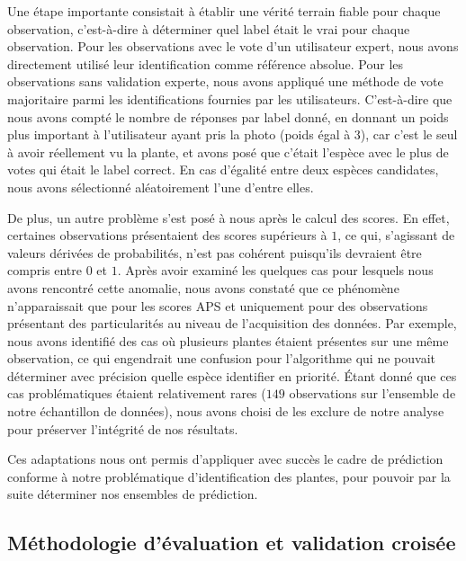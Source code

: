 \documentclass[a4paper,12pt]{article}
\begin{document}
Une étape importante consistait à établir une vérité terrain fiable pour chaque observation, c'est-à-dire à déterminer quel label était le vrai pour chaque observation. Pour les observations avec le vote d'un utilisateur expert, nous avons directement utilisé leur identification comme référence absolue. Pour les observations sans validation experte, nous avons appliqué une méthode de vote majoritaire parmi les identifications fournies par les utilisateurs. C'est-à-dire que nous avons compté le nombre de réponses par label donné, en donnant un poids plus important à l'utilisateur ayant pris la photo (poids égal à $3$), car c'est le seul à avoir réellement vu la plante, et avons posé que c'était l'espèce avec le plus de votes qui était le label correct. En cas d'égalité entre deux espèces candidates, nous avons sélectionné aléatoirement l'une d'entre elles.

\vspace{0.2cm}

De plus, un autre problème s'est posé à nous après le calcul des scores. En effet, certaines observations présentaient des scores supérieurs à $1$, ce qui, s'agissant de valeurs dérivées de probabilités, n'est pas cohérent puisqu'ils devraient être compris entre $0$ et $1$. Après avoir examiné les quelques cas pour lesquels nous avons rencontré cette anomalie, nous avons constaté que ce phénomène n'apparaissait que pour les scores APS et uniquement pour des observations présentant des particularités au niveau de l'acquisition des données. Par exemple, nous avons identifié des cas où plusieurs plantes étaient présentes sur une même observation, ce qui engendrait une confusion pour l'algorithme qui ne pouvait déterminer avec précision quelle espèce identifier en priorité. Étant donné que ces cas problématiques étaient relativement rares ($149$ observations sur l'ensemble de notre échantillon de données), nous avons choisi de les exclure de notre analyse pour préserver l'intégrité de nos résultats.

\vspace{0.2cm}

Ces adaptations nous ont permis d'appliquer avec succès le cadre de prédiction conforme à notre problématique d'identification des plantes, pour pouvoir par la suite déterminer nos ensembles de prédiction.


\subsection{Méthodologie d'évaluation et validation croisée}
\end{document}
